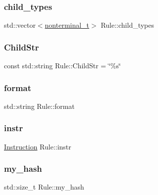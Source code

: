 \subsubsection{\texorpdfstring{child\+\_\+types}{child\_types}}
{\footnotesize\ttfamily std\+::vector$<$\hyperlink{_nonterminal_8h_a1c5bfe9b903f69c83bbde5da7035fef3}{nonterminal\+\_\+t}$>$ Rule\+::child\+\_\+types\hspace{0.3cm}{\ttfamily [protected]}}

\mbox{\label{class_rule_a3ffb425ebd6c508ca47234e3800f769c}} 
\subsubsection{\texorpdfstring{Child\+Str}{ChildStr}}
{\footnotesize\ttfamily const std\+::string Rule\+::\+Child\+Str = \char`\"{}\%s\char`\"{}\hspace{0.3cm}{\ttfamily [static]}}

\mbox{\label{class_rule_aa48c15aaaf5242afea0439607f2a2177}} 
\subsubsection{\texorpdfstring{format}{format}}
{\footnotesize\ttfamily std\+::string Rule\+::format}

\mbox{\label{class_rule_a367e578f5e1427ef04d1d77477565c67}} 
\subsubsection{\texorpdfstring{instr}{instr}}
{\footnotesize\ttfamily \hyperlink{class_instruction}{Instruction} Rule\+::instr}

\mbox{\label{class_rule_af2d873c97e2de425f14a5a980dbcc104}} 
\subsubsection{\texorpdfstring{my\+\_\+hash}{my\_hash}}
{\footnotesize\ttfamily std\+::size\+\_\+t Rule\+::my\+\_\+hash\hspace{0.3cm}{\ttfamily [protected]}}

